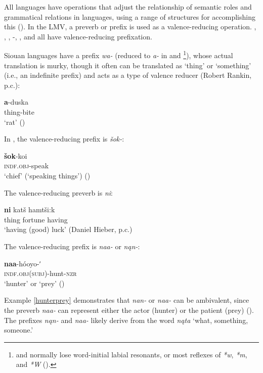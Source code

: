 \documentclass[output=paper]{LSP/langsci}
\begin{document}
All languages have operations that adjust the relationship of semantic roles and grammatical relations in languages, using a range of structures for accomplishing this (\citealt[169]{Payne1997}). In the LMV, a preverb or prefix is used as a valence-reducing operation. , , , -, , and  all have valence-reducing prefixation. 	

	Siouan languages have a prefix \emph{wa-} (reduced to \emph{a-} in  and \footnote{ and  normally lose word-initial labial resonants, or most reflexes of \emph{*w}, \emph{*m}, and \emph{*W} (\citealt[19]{Rankin2002}).}), whose actual translation is murky, though it often can be translated as `thing' or `something' (i.e., an indefinite  prefix) and acts as a type of valence reducer (Robert Rankin, p.c.):

\ea
\gll	\textbf{a}-duska\\
		thing-bite\\
\glt	 `rat' (\citealt[186]{DorseySwanton1912})
\z

	In , the valence-reducing prefix is \emph{šok-}:

\ea
\gll	\textbf{šok}-koi\\
		\textsc{indf.obj}-speak \\

\glt	`chief' (`speaking things') (\citealt[9]{GatschetSwanton1932})
\z

The  valence-reducing preverb is \emph{ni}:

\ea
\gll	\textbf{ni} 	katš hamtši:k \\
	thing fortune having\\

\glt `having (good) luck' (Daniel Hieber, p.c.)
\z

	The  valence-reducing prefix is \emph{naa-} or \emph{nąn-}:
	
\ea\label{hunterprey}
\gll	\textbf{naa}-hóoyo-ʹ~\\
		\textsc{indf.obj(subj)}-hunt-\textsc{nzr}\\
\glt	`hunter' or `prey' (\citealt[53]{Broadwell2006})
\z

Example \ref{hunterprey} demonstrates that  \emph{nan-} or \emph{naa-} can be ambivalent, since the preverb \emph{naa-} can represent either the actor (hunter) or the patient (prey) (\citealt[53]{Broadwell2006}). The  prefixes \emph{nąn-} and \emph{naa-} likely derive from the word \emph{nąta} `what, something, someone.'
 
\end{document}
